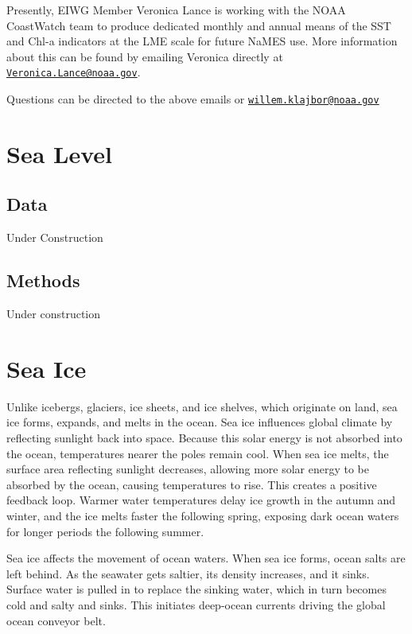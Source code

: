 \documentclass[
]{book}
\begin{document}
Presently, EIWG Member Veronica Lance is working with the NOAA CoastWatch team to produce dedicated monthly and annual means of the SST and Chl-a indicators at the LME scale for future NaMES use. More information about this can be found by emailing Veronica directly at \href{mailto:Veronica.Lance@noaa.gov}{\nolinkurl{Veronica.Lance@noaa.gov}}.

Questions can be directed to the above emails or \href{mailto:willem.klajbor@noaa.gov}{\nolinkurl{willem.klajbor@noaa.gov}}

\hypertarget{sea-level}{%
\chapter{Sea Level}\label{sea-level}}

\hypertarget{data-8}{%
\section{Data}\label{data-8}}

Under Construction

\hypertarget{methods-8}{%
\section{Methods}\label{methods-8}}

Under construction

\hypertarget{sea-ice}{%
\chapter{Sea Ice}\label{sea-ice}}

Unlike icebergs, glaciers, ice sheets, and ice shelves, which originate on land, sea ice forms, expands, and melts in the ocean. Sea ice influences global climate by reflecting sunlight back into space. Because this solar energy is not absorbed into the ocean, temperatures nearer the poles remain cool. When sea ice melts, the surface area reflecting sunlight decreases, allowing more solar energy to be absorbed by the ocean, causing temperatures to rise. This creates a positive feedback loop. Warmer water temperatures delay ice growth in the autumn and winter, and the ice melts faster the following spring, exposing dark ocean waters for longer periods the following summer.

Sea ice affects the movement of ocean waters. When sea ice forms, ocean salts are left behind. As the seawater gets saltier, its density increases, and it sinks. Surface water is pulled in to replace the sinking water, which in turn becomes cold and salty and sinks. This initiates deep-ocean currents driving the global ocean conveyor belt.
\end{document}
